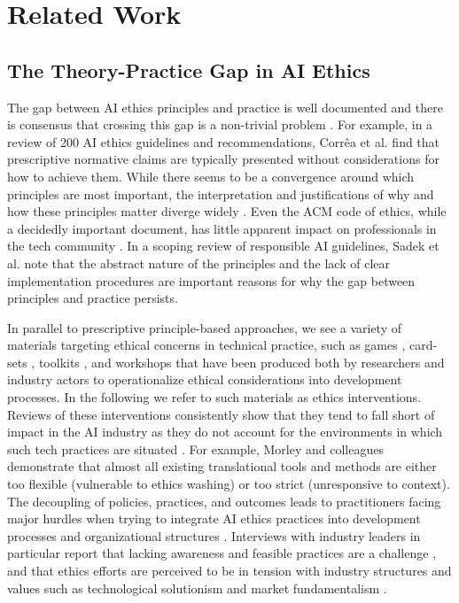 \section{Related Work}
\subsection{The Theory-Practice Gap in AI Ethics}
The gap between AI ethics principles and practice is well documented \cite{fjeld2020principled, mittelstadt2019principles} and there is consensus that crossing this gap is a non-trivial problem \cite{munn2023uselessness}. For example, in a review of 200 AI ethics guidelines and recommendations, Corrêa et al. \cite{correa2023worldwide} find that prescriptive normative claims are typically presented without considerations for how to achieve them. While there seems to be a convergence around which principles are most important, the interpretation and justifications of why and how these principles matter diverge widely \cite{jobin2019global}. Even the ACM code of ethics, while a decidedly important document, has little apparent impact on professionals in the tech community \cite{mcnamara2018does}. In a scoping review of responsible AI guidelines, Sadek et al. \cite{sadek2024challenges} note that the abstract nature of the principles and the lack of clear implementation procedures are important reasons for why the gap between principles and practice persists. 

In parallel to prescriptive principle-based approaches, we see a variety of materials targeting ethical concerns in technical practice, such as games \cite{ballard2019judgment, ali_ai_2023}, card-sets \cite{tkautz_cards_2021, artefact_tarot_nodate, calderon_blindspots_2021, ECCOLA}, toolkits \cite{tangible_ethical_nodate, gispen_ethics_2017, zou_design_2018}, and workshops \cite{33a_ai_2022, doteveryone_consequence_nodate, open_data_2021, hyper_island_unintended_nodate} that have been produced both by researchers and industry actors to operationalize ethical considerations into development processes. In the following we refer to such materials as ethics interventions. Reviews of these interventions consistently show that they tend to fall short of impact in the AI industry \cite{chivukula2021surveying, wong2023seeing, hagendorff2020ethics} as they do not account for the environments in which such tech practices are situated \cite{yildirim2023investigating, liao2020questioning, chivukula2020dimensions, winkler2021twenty}. For example, Morley and colleagues \cite{morley2020initial} demonstrate that almost all existing translational tools and methods are either too flexible (vulnerable to ethics washing) or too strict (unresponsive to context). The decoupling of policies, practices, and outcomes leads to practitioners facing major hurdles when trying to integrate AI ethics practices into development processes and organizational structures \cite{ali_ai_2023}. Interviews with industry leaders in particular report that lacking awareness and feasible practices are a challenge \cite{lindberg2024doing}, and that ethics efforts are perceived to be in tension with industry structures and values such as technological solutionism and market fundamentalism \cite{lindberg2024doing, metcalf2019owning}. 


